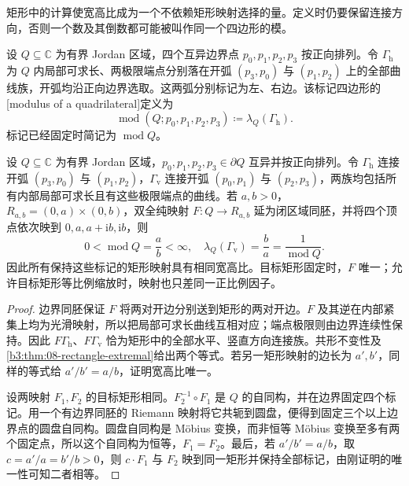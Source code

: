 矩形中的计算使宽高比成为一个不依赖矩形映射选择的量。定义时仍要保留连接方向，否则一个数及其倒数都可能被叫作同一个四边形的模。

\begin{definition}\label{b3:def:08-quadrilateral-modulus}
设 \(Q\subseteq\mathbb C\) 为有界 Jordan 区域，四个互异边界点 \(p_0,p_1,p_2,p_3\) 按正向排列。令 \(\Gamma_{\mathrm h}\) 为 \(Q\) 内局部可求长、两极限端点分别落在开弧 \((p_3,p_0)\) 与 \((p_1,p_2)\) 上的全部曲线族，开弧均沿正向边界选取。这两弧分别标记为左、右边。该标记四边形的[modulus of a quadrilateral]定义为
\[
 \operatorname{mod}(Q;p_0,p_1,p_2,p_3)
 \coloneqq\lambda_Q(\Gamma_{\mathrm h}).
\]
标记已经固定时简记为 \(\operatorname{mod}Q\)。
\end{definition}

\begin{proposition}[矩形参数及标记唯一性]\label{b3:prop:08-marked-modulus-uniqueness}
设 \(Q\subseteq\mathbb C\) 为有界 Jordan 区域，\(p_0,p_1,p_2,p_3\in\partial Q\) 互异并按正向排列。令 \(\Gamma_{\mathrm h}\) 连接开弧 \((p_3,p_0)\) 与 \((p_1,p_2)\)，\(\Gamma_{\mathrm v}\) 连接开弧 \((p_0,p_1)\) 与 \((p_2,p_3)\)，两族均包括所有内部局部可求长且有这些极限端点的曲线。若 \(a,b>0\)，\(R_{a,b}=(0,a)\times(0,b)\)，双全纯映射 \(F:Q\rightarrow R_{a,b}\) 延为闭区域同胚，并将四个顶点依次映到 \(0,a,a+\mathrm{i}b,\mathrm{i}b\)，则
\[
 0<\operatorname{mod}Q=\frac ab<\infty,\quad
 \lambda_Q(\Gamma_{\mathrm v})=\frac ba
 =\frac1{\operatorname{mod}Q}.
\]
因此所有保持这些标记的矩形映射具有相同宽高比。目标矩形固定时，\(F\) 唯一；允许目标矩形等比例缩放时，映射也只差同一正比例因子。
\end{proposition}
\begin{proof}
边界同胚保证 \(F\) 将两对开边分别送到矩形的两对开边。\(F\) 及其逆在内部紧集上均为光滑映射，所以把局部可求长曲线互相对应；端点极限则由边界连续性保持。因此 \(F\Gamma_{\mathrm h}\)、\(F\Gamma_{\mathrm v}\) 恰为矩形中的全部水平、竖直方向连接族。共形不变性及\cref{b3:thm:08-rectangle-extremal}给出两个等式。若另一矩形映射的边长为 \(a',b'\)，同样的等式给 \(a'/b'=a/b\)，证明宽高比唯一。

设两映射 \(F_1,F_2\) 的目标矩形相同。\(F_2^{-1}\circ F_1\) 是 \(Q\) 的自同构，并在边界固定四个标记。用一个有边界同胚的 Riemann 映射将它共轭到圆盘，便得到固定三个以上边界点的圆盘自同构。圆盘自同构是 Möbius 变换，而非恒等 Möbius 变换至多有两个固定点，所以这个自同构为恒等，\(F_1=F_2\)。最后，若 \(a'/b'=a/b\)，取 \(c=a'/a=b'/b>0\)，则 \(c\cdot F_1\) 与 \(F_2\) 映到同一矩形并保持全部标记，由刚证明的唯一性可知二者相等。
\end{proof}

